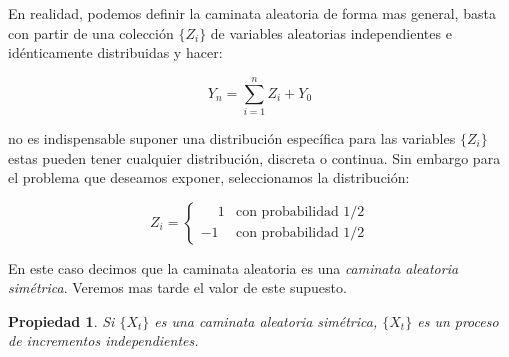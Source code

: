 \documentclass{extreport}
\theoremstyle{definicion}
\theoremstyle{propiedad}
\newtheorem{propiedad}{Propiedad}[chapter]
\theoremstyle{teorema}
\begin{document}
En realidad, podemos definir la caminata aleatoria de forma mas general, basta con partir de una colección $\{Z_i\}$ de variables aleatorias independientes e idénticamente distribuidas  y hacer:

$$
Y_n = \sum_{i=1}^n Z_i + Y_0
$$

no es indispensable suponer una distribución específica para las variables $\{Z_i\}$ estas pueden tener cualquier distribución, discreta o continua. Sin embargo para el problema que deseamos exponer, seleccionamos la distribución:

$$
Z_i = \begin{cases} \phantom{-}1 & \text{con probabilidad }1/2  \\ 
-1 & \text{con probabilidad }1/2\end{cases}
$$

En este caso decimos que la caminata aleatoria es una \emph{caminata aleatoria simétrica}. Veremos mas tarde el valor de este supuesto.


\begin{propiedad}
    Si $\{X_t\}$ es una caminata aleatoria simétrica, $\{X_t\}$ es un proceso de incrementos independientes.
\end{propiedad}
\end{document}
